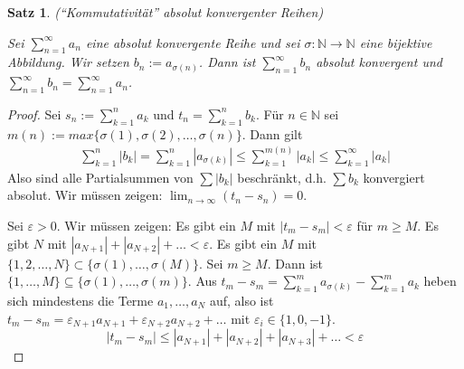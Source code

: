 \documentclass[a4paper,10pt]{article}
\newtheorem{satz}{Satz}
\begin{document}
\begin{satz}
 (``Kommutativität'' absolut konvergenter Reihen)

 Sei $\sum_{n = 1}^\infty a_n$ eine absolut konvergente Reihe und sei $\sigma: \mathbb{N} \rightarrow \mathbb{N}$ eine bijektive Abbildung.
 Wir setzen $b_n := a_{\sigma(n)}$.
 Dann ist $\sum_{n = 1}^\infty b_n$ absolut konvergent und $\sum_{n = 1}^\infty b_n = \sum_{n = 1}^\infty a_n$.
\end{satz}

\begin{proof}
 Sei $s_n := \sum_{k = 1}^n a_k$ und $t_n = \sum_{k = 1}^n b_k$.
 Für $n \in \mathbb{N}$ sei $m(n) := max \{\sigma(1), \sigma(2), \dots, \sigma(n)\}$.
 Dann gilt
 \begin{align*}
  \sum_{k = 1}^n |b_k| = \sum_{k = 1}^n |a_{\sigma(k)}| \le \sum_{k = 1}^{m(n)} |a_k| \le \sum_{k = 1}^\infty |a_k|
 \end{align*}
 Also sind alle Partialsummen von $\sum |b_k|$ beschränkt, d.h. $\sum b_k$ konvergiert absolut.
 Wir müssen zeigen: $\lim_{n \rightarrow \infty} (t_n - s_n) = 0$.
 
 Sei $\varepsilon > 0$.
 Wir müssen zeigen: Es gibt ein $M$ mit $|t_m - s_m| < \varepsilon$ für $m \ge M$.
 Es gibt $N$ mit $|a_{N + 1}| + |a_{N + 2}| + \dots < \varepsilon$.
 Es gibt ein $M$ mit $\{1, 2, \dots, N\} \subset \{\sigma(1), \dots, \sigma(M)\}$.
 Sei $m \ge M$.
 Dann ist $\{1, \dots, M\} \subseteq \{\sigma(1), \dots, \sigma(m)\}$.
 Aus $t_m - s_m = \sum_{k = 1}^m a_{\sigma(k)} - \sum_{k = 1}^m a_k$ heben sich mindestens die Terme $a_1, \dots, a_N$ auf, also ist $t_m - s_m = \varepsilon_{N + 1}a_{N + 1} + \varepsilon_{N + 2}a_{N + 2} + \dots$ mit $\varepsilon_i \in \{1, 0, -1\}$.
 \begin{equation*}
  |t_m - s_m| \le |a_{N + 1}| + |a_{N + 2}| + |a_{N + 3}| + \dots < \varepsilon
 \end{equation*}
\end{proof}
\end{document}
